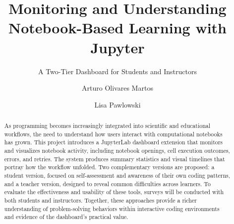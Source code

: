 \documentclass[manuscript,screen,review]{acmart}
\begin{document}
\title{Monitoring and Understanding Notebook-Based Learning with Jupyter}
\subtitle{A Two-Tier Dashboard for Students and Instructors}


\author{Arturo Olivares Martos}

\author{Lisa Pawlowski}


\begin{abstract}
  As programming becomes increasingly integrated into scientific and educational workflows, the need to understand how users interact with computational notebooks has grown. This project introduces a JupyterLab dashboard extension that monitors and visualizes notebook activity, including notebook openings, cell execution outcomes, errors, and retries. The system produces summary statistics and visual timelines that portray how the workflow unfolded. Two complementary versions are proposed: a student version, focused on self-assessment and awareness of their own coding patterns, and a teacher version, designed to reveal common difficulties across learners. To evaluate the effectiveness and usability of these tools, surveys will be conducted with both students and instructors. Together, these approaches provide a richer understanding of problem-solving behaviors within interactive coding environments and evidence of the dashboard's practical value.
\end{abstract}
\end{document}
